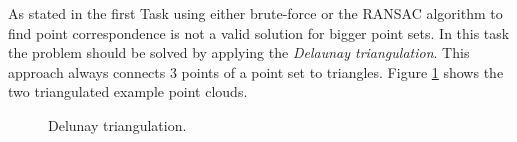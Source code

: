 As stated in the first Task using either brute-force or the RANSAC algorithm to find point correspondence is not a valid solution for bigger point sets. In this task the problem should be solved by applying the \textit{Delaunay triangulation}\cite{Delaunay2020}. This approach always connects 3 points of a point set to triangles. Figure \ref{fig:DelunayTri} shows the two triangulated example point clouds.

\begin{figure}
	\centering
	\begin{minipage}[t]{0.49\linewidth}
		\centering
	\end{minipage}
	\hfill
	\begin{minipage}[t]{0.49\linewidth}
		\centering
	\end{minipage}
	\caption{Delunay triangulation.}
	\label{fig:DelunayTri}
\end{figure}


